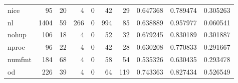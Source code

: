 \begin{longtable}{lrrrrrrrrr}
nice      &                                                 95 &                                                 20 &                                                  4 &                                                  0 &                                                 42 &                                                 29 &                                           0.647368 &                               0.789474 &                             0.305263 \\
nl        &                                               1404 &                                                 59 &                                                266 &                                                  0 &                                                994 &                                                 85 &                                           0.638889 &                               0.957977 &                             0.060541 \\
nohup     &                                                106 &                                                 18 &                                                  4 &                                                  0 &                                                 52 &                                                 32 &                                           0.679245 &                               0.830189 &                             0.301887 \\
nproc     &                                                 96 &                                                 22 &                                                  4 &                                                  0 &                                                 42 &                                                 28 &                                           0.630208 &                               0.770833 &                             0.291667 \\
numfmt    &                                                184 &                                                 68 &                                                  4 &                                                  0 &                                                 58 &                                                 54 &                                           0.535326 &                               0.630435 &                             0.293478 \\
od        &                                                226 &                                                 39 &                                                  4 &                                                  0 &                                                 64 &                                                119 &                                           0.743363 &                               0.827434 &                             0.526549 \\

\end{longtable}
